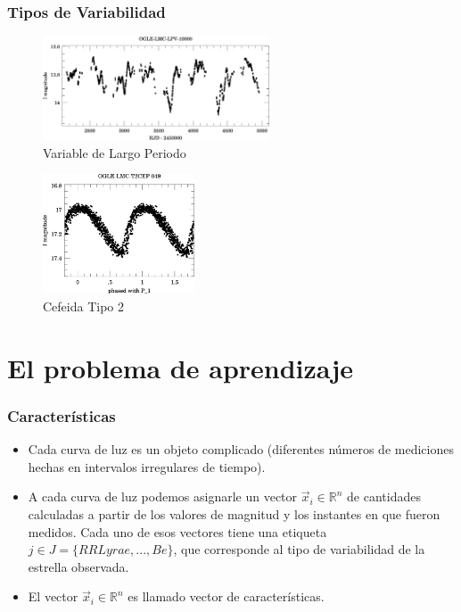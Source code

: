 \documentclass{beamer}
\begin{document}
\begin{frame}
  \frametitle{Tipos de Variabilidad}
  \begin{figure}
    \centering
    \includegraphics[width=0.6\textwidth]{./img/OGLE-LMC-LPV-10000.jpg}
    \caption{Variable de Largo Periodo}
    \label{fig:gull}
  \end{figure}%
  \begin{figure}
    \centering
    \includegraphics[width=0.4\textwidth]{./img/OGLE-LMC-T2CEP-049_1.jpg}
    \caption{Cefeida Tipo 2}
    \label{fig:gull}
  \end{figure}%
  
\end{frame}


\section{El problema de aprendizaje}
\begin{frame}%
  \frametitle{Características}
\begin{itemize}
   \item Cada curva de luz es un objeto complicado (diferentes números de mediciones hechas en intervalos irregulares de tiempo).  
   \item A cada curva de luz podemos asignarle un vector $\vec{x}_i\in\mathbb{R}^n$ de cantidades calculadas a partir de los valores de magnitud y los instantes en que fueron medidos. Cada uno de esos vectores tiene una etiqueta $j\in J = \{RR Lyrae,..., Be\}$, que corresponde al tipo de variabilidad de la estrella observada.
     \item El vector $\vec{x}_i\in\mathbb{R}^n$  es llamado vector de características.
\end{itemize}
\end{frame}
\end{document}
